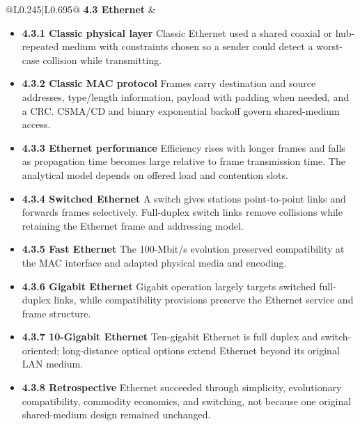 \documentclass[10pt,letterpaper]{article}
\begin{document}
\begin{longtable}{@{}L{0.245\textwidth}|L{0.695\textwidth}@{}}
\textbf{4.3 Ethernet} & \begin{minipage}[t]{\linewidth}\raggedright \begin{itemize}\item \textbf{4.3.1 Classic physical layer} Classic Ethernet used a shared coaxial or hub-repeated medium with constraints chosen so a sender could detect a worst-case collision while transmitting.\item \textbf{4.3.2 Classic MAC protocol} Frames carry destination and source addresses, type/length information, payload with padding when needed, and a CRC. CSMA/CD and binary exponential backoff govern shared-medium access.\item \textbf{4.3.3 Ethernet performance} Efficiency rises with longer frames and falls as propagation time becomes large relative to frame transmission time. The analytical model depends on offered load and contention slots.\item \textbf{4.3.4 Switched Ethernet} A switch gives stations point-to-point links and forwards frames selectively. Full-duplex switch links remove collisions while retaining the Ethernet frame and addressing model.\item \textbf{4.3.5 Fast Ethernet} The 100-Mbit/s evolution preserved compatibility at the MAC interface and adapted physical media and encoding.\item \textbf{4.3.6 Gigabit Ethernet} Gigabit operation largely targets switched full-duplex links, while compatibility provisions preserve the Ethernet service and frame structure.\item \textbf{4.3.7 10-Gigabit Ethernet} Ten-gigabit Ethernet is full duplex and switch-oriented; long-distance optical options extend Ethernet beyond its original LAN medium.\item \textbf{4.3.8 Retrospective} Ethernet succeeded through simplicity, evolutionary compatibility, commodity economics, and switching, not because one original shared-medium design remained unchanged.\end{itemize}\end{minipage} \\ \hline

\end{longtable}
\end{document}
